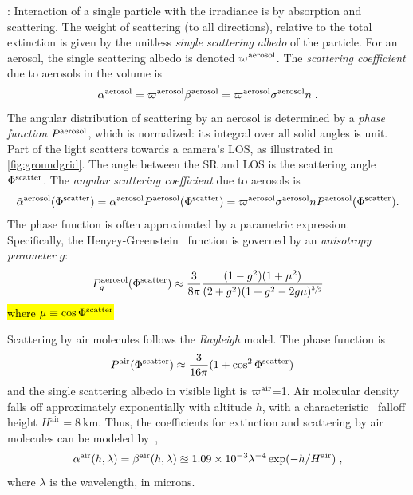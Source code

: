 \documentclass[10pt,letterpaper]{article}
\begin{document}
: Interaction of a single particle with the
irradiance is by absorption and scattering. The weight of scattering
(to all directions), relative to the total extinction is given by the
unitless {\em single scattering albedo} of the particle. For an
aerosol, the single scattering albedo is denoted $\varpi^{\rm
  aerosol}$.  The {\em scattering coefficient} due to aerosols in the
volume is
\begin{align}
  \alpha^{\rm aerosol}= \varpi^{\rm aerosol}\beta^{\rm aerosol}
  =\varpi^{\rm aerosol} \sigma^{\rm aerosol} n \;.
  \label{eq:alph}
\end{align}
The angular distribution of scattering by an aerosol is determined by
a {\em phase function} $P^{\rm aerosol}$, which is normalized: its
integral over all solid angles is unit. Part of the light scatters
towards a camera's LOS, as illustrated in \cref{fig:groundgrid}. The
angle between the SR and LOS is the scattering angle $\Phi^{\rm
  scatter}$. The {\em angular scattering coefficient} due to aerosols
is
\begin{align}
  \tilde\alpha^{\rm aerosol}(\Phi^{\rm scatter}) = \alpha^{\rm
    aerosol} P^{\rm aerosol}(\Phi^{\rm scatter}) = \varpi^{\rm
    aerosol} \sigma^{\rm aerosol} n P^{\rm aerosol}(\Phi^{\rm
    scatter}).
  \label{eq:alphabasic}
\end{align}
The phase function is often approximated by a parametric
expression. Specifically, the Henyey-Greenstein~\cite{Cornette1995}
function is governed by an {\em anisotropy parameter} $g$:
\begin{align}
  P^{\rm aerosol}_g(\Phi^{\rm scatter})\approx \frac{3}{8\pi} \frac{(1 -
  g^2)(1+\mu^2)}{(2+g^2)(1 + g^2 - 2g\mu)^{\sfrac{3}{2}}}
  \label{eq:aerosol_scatter}
\end{align}
\hl{where $\mu\equiv \cos \Phi^{\rm scatter}$}

Scattering by air molecules follows the {\em Rayleigh} model. The
phase function is
\begin{align}
  P^{\rm air}(\Phi^{\rm scatter}) &\approx
  \frac{3}{16\pi}(1+\cos^2\Phi^{\rm scatter})
  \label{eq:rayleighP}
\end{align}
and the single scattering albedo in visible light is $\varpi^{\rm
  air}$=1. Air molecular density falls off approximately exponentially
with altitude $h$, with a characteristic~\cite{Levi1980} falloff
height $H^\mathrm{air}=8\ \si{\km}$. Thus, the
coefficients for extinction and scattering by air molecules can be
modeled by~\cite{Levi1980},
\begin{align}
  \alpha^{\rm air}(h, \lambda)=\beta^{\rm air}(h, \lambda) \approxeq
  1.09 \times 10^{-3}\lambda^{-4} \exp(-h/H^\mathrm{air})
  \;,%
  \label{eq:rayleighbeta}
\end{align}
where $\lambda$ is the wavelength, in microns.
\\
\end{document}

